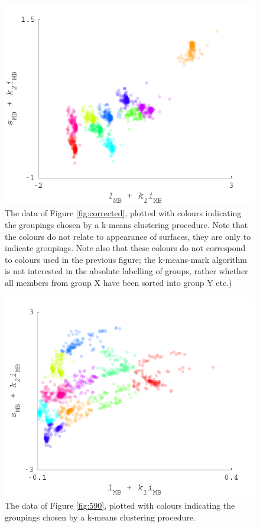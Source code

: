 \begin{figure}[htbp]
 \includegraphics[max width=\textwidth]{figs/comp/KMeansMarkDemo/1.pdf}
 \caption{The data of Figure \ref{fig:corrected}, plotted with colours indicating the groupings chosen by a k-means clustering procedure. Note that the colours do not relate to appearance of surfaces, they are only to indicate groupings. Note also that these colours do not correspond to colours used in the previous figure; the k-means-mark algorithm is not interested in the absolute labelling of groups, rather whether all members from group X have been sorted into group Y etc.)}
 \label{fig:KM1}
\end{figure} 

\begin{figure}[htbp]
 \includegraphics[max width=\textwidth]{figs/comp/KMeansMarkDemo/2.pdf}
 \caption{The data of Figure \ref{fig:590}, plotted with colours indicating the groupings chosen by a k-means clustering procedure.}
 \label{fig:KM2}
\end{figure} 

